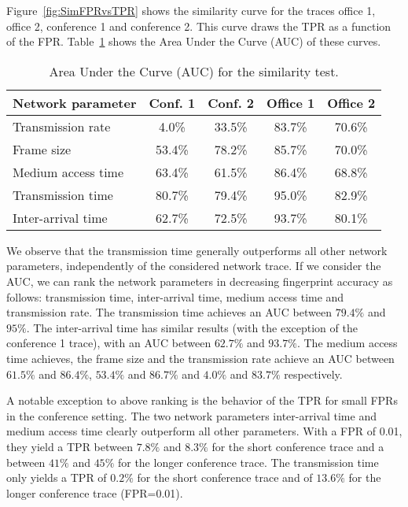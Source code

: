 \documentclass[10pt, conference, compsocconf, letterpaper]{IEEEtran}
\begin{document}
Figure~\ref{fig:SimFPRvsTPR} shows the similarity  curve for the traces office 1, office 2, conference 1 and conference 2. This curve draws the TPR as a function of the FPR. Table~\ref{tab:simauc} shows the Area Under the Curve (AUC) of these curves.


\begin{table}
{\footnotesize
\begin{center}
\begin{tabular}{l|c|c|c|c}
Network parameter  &  Conf. 1 & Conf. 2 &  Office 1 & Office 2 \\
\hline
Transmission rate& 4.0\%&33.5\%&83.7\%&70.6\%\\
Frame size&  53.4\%& 78.2\%&85.7\%&70.0\%\\
Medium access time&  63.4\%& 61.5\%&86.4\%&68.8\%\\
Transmission time&  80.7\%& 79.4\%&95.0\%&82.9\%\\
Inter-arrival time&  62.7\%& 72.5\%&93.7\%&80.1\%\\
\end{tabular}
\end{center}
}
\caption{Area Under the Curve (AUC) for the similarity test.}
\label{tab:simauc}
\end{table}

We observe that the transmission time generally outperforms all other network parameters, independently of the considered network trace.
If we consider the AUC, we can rank the network parameters in decreasing fingerprint accuracy as follows: transmission time, inter-arrival time, medium access time and transmission rate.
The transmission time achieves an AUC between $79.4\%$ and $95\%$. The inter-arrival time has similar results (with the exception of the conference 1 trace), with an AUC between $62.7\%$ and $93.7\%$. 
The medium access time achieves, the frame size and the transmission rate achieve an AUC between $61.5\%$ and $86.4\%$, $53.4\%$ and $86.7\%$ and $4.0\%$ and $83.7\%$ respectively.

A notable exception to above ranking is the behavior of the TPR for small FPRs in the conference setting. The two network parameters inter-arrival time and medium access time clearly outperform all other parameters.
With a FPR of 0.01, they yield a TPR between $7.8\%$ and $8.3\%$ for the short conference trace and a between $41\%$ and $45\%$ for the longer conference trace.
The transmission time only yields a TPR of $0.2\%$ for the short conference trace and of $13.6\%$ for the longer conference trace (FPR=0.01).
\end{document}
